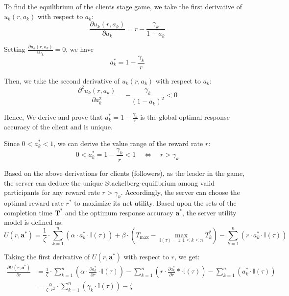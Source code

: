 \documentclass[final,1p,times]{elsarticle}
\begin{document}
To find the equilibrium of the clients stage game, we take the first derivative of $u_k(r,a_k)$ with respect to $a_k$:
\begin{equation}
	\frac{\partial u_k(r,a_k)}{\partial a_k} = r-\frac{\gamma_k}{1-a_k}
\end{equation}	

Setting $\frac{\partial u_k(r,a_k)}{\partial a_k} = 0$, we have
\begin{equation}
	a_k^\ast = 1 - \frac{\gamma_k}{r}
\end{equation}	

Then, we take the second derivative of $u_k(r,a_k)$ with respect to $a_k$:
\begin{equation}
	\frac{\partial^2 u_k(r,a_k)}{\partial a_k^2} = - \frac{\gamma_k}{(1-a_k)^2} < 0
\end{equation}	

Hence, We derive and prove that $a_k^\ast = 1 - \frac{\gamma_k}{r}$ is the global optimal response accuracy of the client and is unique.

Since $0<a_k^\ast<1$, we can derive the value range of the reward rate $r$:
\begin{equation}
	0 < a_k^\ast = 1 - \frac{\gamma_k}{r} < 1\quad
	\Leftrightarrow\quad r > \gamma_k
\end{equation}	

Based on the above derivations for clients (followers), as the leader in the game, the server can deduce the unique Stackelberg-equilibrium among valid participants for any reward rate $r>\gamma_k$. Accordingly, the server can choose the optimal reward rate $r^\ast$ to maximize its net utility. Based upon the sets of the completion time $\bm{T}^\ast$ and the optimum response accuracy $\bm{a}^\ast$, the server utility model is defined as:
\begin{equation}
	U(r,\bm{a}^\ast) = \frac{1}{\zeta}\cdot \sum_{k=1}^n(\alpha\cdot a_k^\ast\cdot \mathbb{I}(\tau)) + \beta\cdot(T_{\max}-\max_{\mathbb{I}(\tau)=1,1\le k\le n}T_k^\ast) - \sum_{k=1}^n(r\cdot a_k^\ast\cdot \mathbb{I}(\tau))
\end{equation}

Taking the first derivative of $U(r,\bm{a}^\ast)$ with respect to $r$, we get:
\begin{equation}
	\begin{aligned}
		\frac{\partial U(r,\bm{a}^\ast)}{\partial r} &= \frac{1}{\zeta}\cdot \sum_{k=1}^n(\alpha\cdot \frac{\partial a_k^\ast}{\partial r}\cdot \mathbb{I}(\tau)) - \sum_{k=1}^n(r\cdot \frac{\partial a_k^\ast}{\partial r}\ast\cdot \mathbb{I}(\tau)) - \sum_{k=1}^n(a_k^\ast\cdot \mathbb{I}(\tau))\\
		&= \frac{\alpha}{\zeta\cdot r^2}\cdot\sum_{k=1}^n(\gamma_k\cdot\mathbb{I}(\tau))-\zeta
	\end{aligned}
\end{equation}
\end{document}
